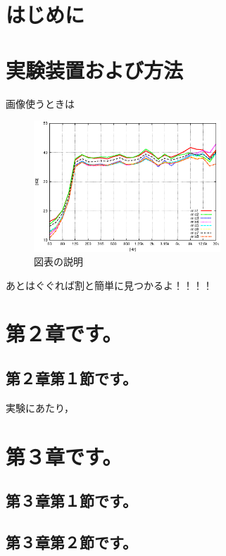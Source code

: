 \documentclass[a4jsme]{jsmepaper}
\date{\today}
\begin{document}
\maketitle
\thispagestyle{fancy}

\section*{はじめに}
\section{実験装置および方法}
画像使うときは\\
\begin{figure}[htbp]
  \begin{center}
    \includegraphics[width=70mm]{img/micfrec.eps}
    \caption{図表の説明}
    \label{fig:one}
  \end{center}
\end{figure}
あとはぐぐれば割と簡単に見つかるよ！！！！

\section{第２章です。}
\subsection{第２章第１節です。\\}\hspace{-1.5zw}
実験にあたり，
\section{第３章です。}
\subsection{第３章第１節です。}
\subsection{第３章第２節です。}
\end{document}
